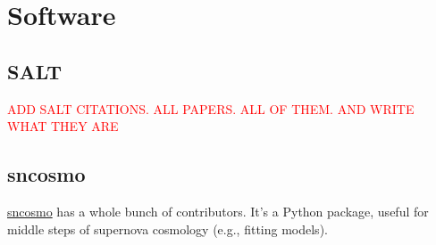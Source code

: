\section{Software}
\label{sec:software}
\subsection{SALT}
\textcolor{red}{ADD SALT CITATIONS. ALL PAPERS. ALL OF THEM. AND WRITE WHAT THEY ARE}
\subsection{sncosmo}

\href{https://github.com/sncosmo/sncosmo}{sncosmo} has a whole bunch of contributors. It's a Python package, useful for middle steps of supernova cosmology (e.g., fitting models). 

